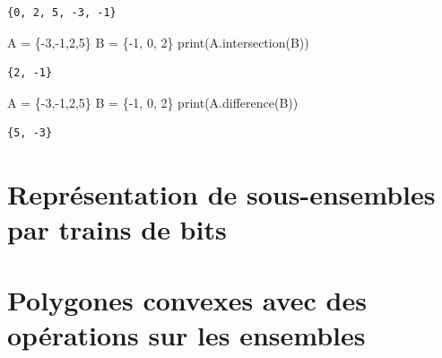 \documentclass[
  letterpaper,
]{scrbook}
\newenvironment{Shaded}{\begin{snugshade}}{\end{snugshade}}
\newcommand{\BuiltInTok}[1]{\textcolor[rgb]{0.00,0.50,0.00}{#1}}
\newcommand{\DecValTok}[1]{\textcolor[rgb]{0.25,0.63,0.44}{#1}}
\newcommand{\NormalTok}[1]{\textcolor[rgb]{0.00,0.44,0.13}{#1}}
\newcommand{\OperatorTok}[1]{\textcolor[rgb]{0.40,0.40,0.40}{#1}}
\theoremstyle{plain}
\theoremstyle{definition}
\theoremstyle{definition}
\theoremstyle{remark}
\begin{document}
\begin{verbatim}
{0, 2, 5, -3, -1}
\end{verbatim}

\hypertarget{intersection-python}{}
\begin{Shaded}
\begin{Highlighting}[]
\NormalTok{A }\OperatorTok{=}\NormalTok{ \{}\OperatorTok{{-}}\DecValTok{3}\NormalTok{,}\OperatorTok{{-}}\DecValTok{1}\NormalTok{,}\DecValTok{2}\NormalTok{,}\DecValTok{5}\NormalTok{\}}
\NormalTok{B }\OperatorTok{=}\NormalTok{ \{}\OperatorTok{{-}}\DecValTok{1}\NormalTok{, }\DecValTok{0}\NormalTok{, }\DecValTok{2}\NormalTok{\}}
\BuiltInTok{print}\NormalTok{(A.intersection(B))}
\end{Highlighting}
\end{Shaded}

\begin{verbatim}
{2, -1}
\end{verbatim}

\hypertarget{difference-python}{}
\begin{Shaded}
\begin{Highlighting}[]
\NormalTok{A }\OperatorTok{=}\NormalTok{ \{}\OperatorTok{{-}}\DecValTok{3}\NormalTok{,}\OperatorTok{{-}}\DecValTok{1}\NormalTok{,}\DecValTok{2}\NormalTok{,}\DecValTok{5}\NormalTok{\}}
\NormalTok{B }\OperatorTok{=}\NormalTok{ \{}\OperatorTok{{-}}\DecValTok{1}\NormalTok{, }\DecValTok{0}\NormalTok{, }\DecValTok{2}\NormalTok{\}}
\BuiltInTok{print}\NormalTok{(A.difference(B))}
\end{Highlighting}
\end{Shaded}

\begin{verbatim}
{5, -3}
\end{verbatim}

\hypertarget{repruxe9sentation-de-sous-ensembles-par-trains-de-bits}{%
\section{Représentation de sous-ensembles par trains de
bits}\label{repruxe9sentation-de-sous-ensembles-par-trains-de-bits}}

\hypertarget{polygones-convexes-avec-des-opuxe9rations-sur-les-ensembles}{%
\section{Polygones convexes avec des opérations sur les
ensembles}\label{polygones-convexes-avec-des-opuxe9rations-sur-les-ensembles}}
\end{document}
